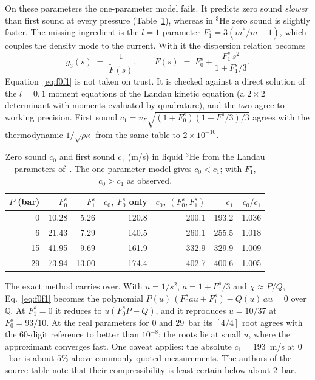 \documentclass[11pt,a4paper]{article}
\newcommand{\Fzs}{F_0^{s}}
\newcommand{\Fos}{F_1^{s}}
\begin{document}
On these parameters the one-parameter model fails. It predicts zero sound \emph{slower} than
first sound at every pressure (Table~\ref{tab:he3}), whereas in $^3$He zero sound is slightly
faster. The missing ingredient is the $l=1$ parameter $\Fos=3(m^*/m-1)$, which couples the density
mode to the current. With it the dispersion relation becomes
\begin{equation}
  g_3(s) \;=\; \frac{1}{\tilde F(s)},\qquad
  \tilde F(s) \;=\; \Fzs + \frac{\Fos\, s^{2}}{1+\Fos/3}.
  \label{eq:f0f1}
\end{equation}
Equation~\eqref{eq:f0f1} is not taken on trust. It is checked against a direct solution of the
$l=0,1$ moment equations of the Landau kinetic equation (a $2\times2$ determinant with moments
evaluated by quadrature), and the two agree to working precision. First sound
$c_1=v_F\sqrt{(1+\Fzs)(1+\Fos/3)/3}$ agrees with the thermodynamic $1/\sqrt{\rho\kappa}$ from the
same table to $2\times10^{-10}$.

\begin{table}[htbp]
\centering
\caption{Zero sound $c_0$ and first sound $c_1$ (m/s) in liquid $^3$He from the Landau
parameters of~\cite{kollar2000}. The one-parameter model gives $c_0<c_1$; with $\Fos$,
$c_0>c_1$ as observed.}
\label{tab:he3}
\begin{tabular}{rrrrrrr}
\toprule
$P$ (bar) & $\Fzs$ & $\Fos$ & $c_0$, $\Fzs$ only & $c_0$, $(\Fzs,\Fos)$ & $c_1$ & $c_0/c_1$ \\
\midrule
0  & 10.28 & 5.26  & 120.8 & 200.1 & 193.2 & 1.036 \\
6  & 21.43 & 7.29  & 140.5 & 260.1 & 255.5 & 1.018 \\
15 & 41.95 & 9.69  & 161.9 & 332.9 & 329.9 & 1.009 \\
29 & 73.94 & 13.00 & 174.4 & 402.7 & 400.6 & 1.005 \\
\bottomrule
\end{tabular}
\end{table}

The exact method carries over. With $u=1/s^2$, $a=1+\Fos/3$ and $\chi\approx P/Q$,
Eq.~\eqref{eq:f0f1} becomes the polynomial
$P(u)\,(\Fzs a u + \Fos) - Q(u)\,a u = 0$ over $\mathbb{Q}$. At $\Fos=0$ it reduces to
$u(\Fzs P-Q)$, and it reproduces $u=10/37$ at $\Fzs=93/10$. At the real parameters for $0$ and
$29$~bar its $[4/4]$ root agrees with the $60$-digit reference to better than $10^{-8}$; the
roots lie at small $u$, where the approximant converges fast. One caveat applies: the absolute
$c_1=193$~m/s at $0$~bar is about $5\%$ above commonly quoted measurements. The authors of the
source table note that their compressibility is least certain below about $2$~bar.
\end{document}
